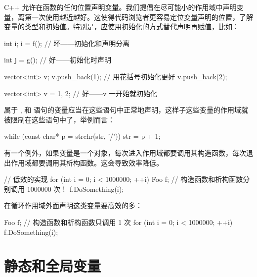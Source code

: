 
C++ 允许在函数的任何位置声明变量。我们提倡在尽可能小的作用域中声明变量，离第一次使用越近越好。这使得代码浏览者更容易定位变量声明的位置，了解变量的类型和初始值。特别是，应使用初始化的方式替代声明再赋值，比如：

\begin{cppcode}
  int i;
  i = f(); // 坏——初始化和声明分离

  int j = g(); // 好——初始化时声明

  vector<int> v;
  v.push_back(1); // 用花括号初始化更好
  v.push_back(2);

  vector<int> v = {1, 2}; // 好——v 一开始就初始化
\end{cppcode}

属于 ,  和  语句的变量应当在这些语句中正常地声明，这样子这些变量的作用域就被限制在这些语句中了，举例而言：

\begin{cppcode}
  while (const char* p = strchr(str, '/')) str = p + 1;
\end{cppcode}

\begin{DWarn}
有一个例外，如果变量是一个对象，每次进入作用域都要调用其构造函数，每次退出作用域都要调用其析构函数。这会导致效率降低。
\end{DWarn}

\begin{cppcode}
  // 低效的实现
  for (int i = 0; i < 1000000; ++i) {
      Foo f;                  // 构造函数和析构函数分别调用 1000000 次！
      f.DoSomething(i);
    }
\end{cppcode}

在循环作用域外面声明这类变量要高效的多：

\begin{cppcode}
  Foo f;                      // 构造函数和析构函数只调用 1 次
  for (int i = 0; i < 1000000; ++i) {
      f.DoSomething(i);
    }
\end{cppcode}


\section{静态和全局变量} \label{static-and-global-variables}


